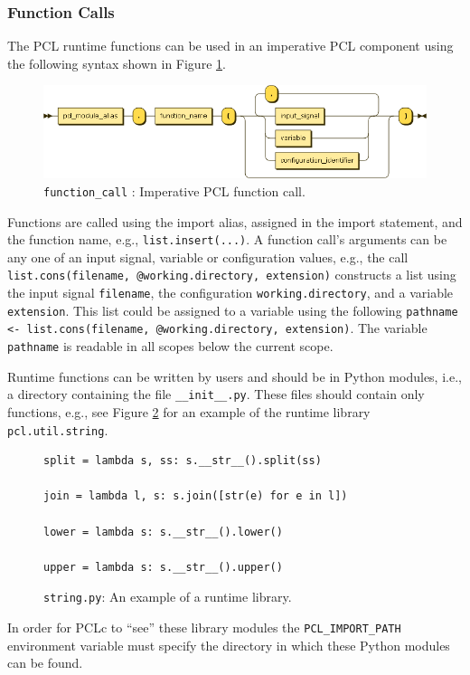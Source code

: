 \subsubsection{Function Calls}
The PCL runtime functions can be used in an imperative PCL component using the following syntax shown in Figure \ref{fig:imperative-pcl-function-call}.
\begin{figure}[h!]
  \centering
    \includegraphics[scale=0.45]{chapters/adapter/diagrams/function_call}
  \caption{\texttt{function\_call} : Imperative PCL function call.}
  \label{fig:imperative-pcl-function-call}
\end{figure}
Functions are called using the import alias, assigned in the import statement, and the function name, e.g., \texttt{list.insert(...)}. A function call's arguments can be any one of an input signal, variable or configuration values, e.g., the call \texttt{list.cons(filename, @working.directory, extension)} constructs a list using the input signal \texttt{filename}, the configuration \texttt{working.directory}, and a variable \texttt{extension}. This list could be assigned to a variable using the following \texttt{pathname <- list.cons(filename, @working.directory, extension)}. The variable \texttt{pathname} is readable in all scopes below the current scope.

Runtime functions can be written by users and should be in Python modules, i.e., a directory containing the file \texttt{\_\_init\_\_.py}. These files should contain only functions, e.g., see Figure \ref{fig:imperative-pcl-runtime-library} for an example of the runtime library \texttt{pcl.util.string}.
\begin{figure}[h!]
  \begin{verbatim}
split = lambda s, ss: s.__str__().split(ss)

join = lambda l, s: s.join([str(e) for e in l])

lower = lambda s: s.__str__().lower()

upper = lambda s: s.__str__().upper()
  \end{verbatim}
  \caption{\texttt{string.py}: An example of a runtime library.}
  \label{fig:imperative-pcl-runtime-library}
\end{figure}
In order for PCLc to ``see'' these library modules the \texttt{PCL\_IMPORT\_PATH} environment variable must specify the directory in which these Python modules can be found.

